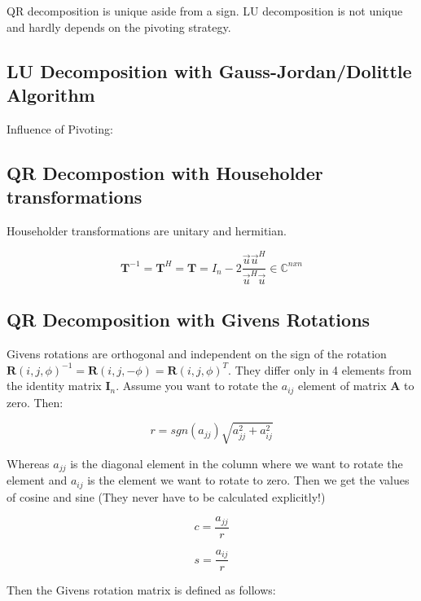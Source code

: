 \documentclass[
    a4paper,
    11pt
]{article}
\begin{document}
QR decomposition is unique aside from a sign.
LU decomposition is not unique and hardly depends on the pivoting strategy.

\subsection{LU Decomposition with Gauss-Jordan/Dolittle Algorithm}

Influence of Pivoting:

\subsection{QR Decompostion with Householder transformations}

Householder transformations are unitary and hermitian.

\begin{equation}
    \mathbf{T}^{-1} = \mathbf{T}^H = \mathbf{T} = I_n - 2
    \frac{\vec{u}\vec{u}^H}{\vec{u}^H\vec{u}} \in \mathbb{C}^{n x n}
\end{equation}

\subsection{QR Decomposition with Givens Rotations}

Givens rotations are orthogonal and independent on the sign of the
rotation $\mathbf{R}(i,j,\phi)^{-1} = \mathbf{R}(i,j, -\phi) = \mathbf{R}(i,j,
\phi)^{T}$. They differ only in 4 elements from the identity matrix
$\mathbf{I}_n$. Assume you want to rotate the $a_{ij}$ element of matrix
$\mathbf{A}$ to zero. Then:

\begin{equation}
    r = sgn(a_{jj}) \sqrt{a_{jj}^2 + a_{ij}^2}
\end{equation}

Whereas $a_{jj}$ is the diagonal element in the column where we want to rotate
the element and $a_{ij}$ is the element we want to rotate to zero. Then we get
the values of cosine and sine (They never have to be calculated explicitly!)

\begin{equation}
    c = \frac{a_{jj}}{r}
\end{equation}

\begin{equation}
    s = \frac{a_{ij}}{r}
\end{equation}

Then the Givens rotation matrix is defined as follows:
\end{document}
